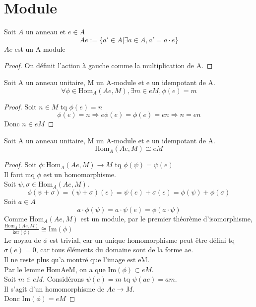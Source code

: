 \chapter{Module}

\begin{definition}[Ae]
    \label{Ae}
    \leanok
    Soit $A$ un anneau et $e \in A$
    \[ Ae := \{a' \in A | \exists a \in A, a' = a \cdot e \} \]
    $Ae$ est un A-module
\end{definition}
\begin{proof}
    \leanok
    On définit l'action à gauche comme la multiplication de A.
\end{proof}

\begin{lemma}[HomAeM]
    \label{HomAeM}
    Soit A un anneau unitaire, M un A-module et e un idempotant de A.
    \[ \forall \phi \in \text{Hom}_{A}(Ae,M), \exists m \in e M, \phi(e)=m\]
\end{lemma}
\begin{proof}
    Soit $ n \in M$ tq $\phi(e)=n$
    \[ \phi(e) = n \Rightarrow e \phi(e) = \phi(e) = e n \Rightarrow n = e n \]
    Donc $ n \in e M$
\end{proof}

\begin{lemma}[HomAeMisoeM]
    \label{HomAeMisoeM}
    Soit A un anneau unitaire, M un A-module et e un idempotant de A.
    \[ \text{Hom}_{A}(A e,M) \cong e M\]
\end{lemma}
\begin{proof}
    Soit $\phi : \text{Hom}_{A}(A e,M) \to M$ tq $\phi(\psi) = \psi(e)$\\
    Il faut mq $\phi$ est un homomorphisme.\\
    Soit $\psi , \sigma \in \text{Hom}_{A}(A e,M)$.\\
    \[ \phi(\psi + \sigma) = (\psi + \sigma)(e) = \psi(e) + \sigma(e) = \phi(\psi) + \phi(\sigma) \]
    Soit $a \in A$
    \[ a \cdot \phi(\psi) = a \cdot \psi(e) = \phi(a \cdot \psi) \]
    Comme $\text{Hom}_{A}(A e,M)$ est un module, par le premier théorème d'isomorphisme, \\
    $\frac{\text{Hom}_{A}(A e,M)}{\text{ker}(\phi)} \cong \text{Im}(\phi)$\\
    Le noyau de $\phi$ est trivial, car un unique homomorphisme peut être défini tq $\sigma(e) = 0$, car tous éléments du domaine sont de la forme ae.\\
    Il ne reste plus qu'a montré que l'image est eM.\\
    Par le lemme HomAeM, on a que $\text{Im}(\phi) \subset e M$.\\
    Soit $m \in e M$. Considérons $\psi(e)=m$ tq $\psi(ae) = am$.\\
    Il s'agit d'un homomorphisme de $A e \to M$.\\
    Donc $\text{Im}(\phi) = e M$
\end{proof}